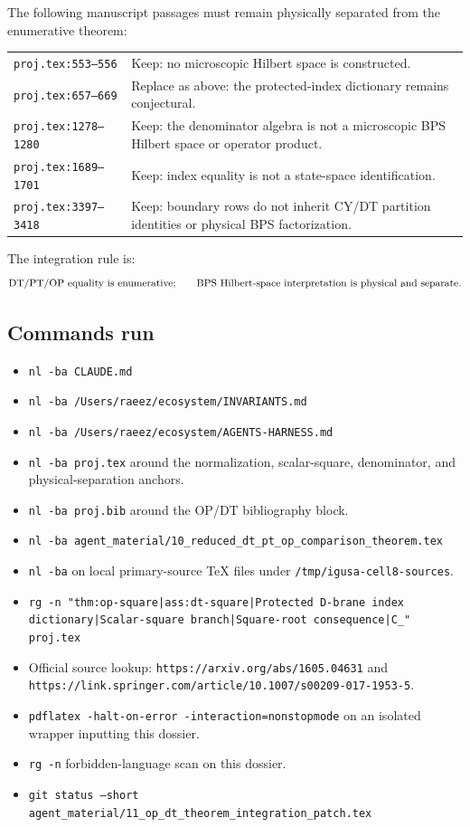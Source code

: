 The following manuscript passages must remain physically separated from
the enumerative theorem:
\begin{center}
\small
\begin{tabular}{p{}p{}}
\texttt{proj.tex:553--556} &
Keep: no microscopic Hilbert space is constructed.\\
\texttt{proj.tex:657--669} &
Replace as above: the protected-index dictionary remains conjectural.\\
\texttt{proj.tex:1278--1280} &
Keep: the denominator algebra is not a microscopic BPS Hilbert space or
operator product.\\
\texttt{proj.tex:1689--1701} &
Keep: index equality is not a state-space identification.\\
\texttt{proj.tex:3397--3418} &
Keep: boundary rows do not inherit CY/DT partition identities or physical
BPS factorization.
\end{tabular}
\end{center}
The integration rule is:
\[
\hbox{DT/PT/OP equality is enumerative;}
\qquad
\hbox{BPS Hilbert-space interpretation is physical and separate.}
\]

\subsection{Commands run}

\begin{itemize}
\item \texttt{nl -ba CLAUDE.md}
\item \texttt{nl -ba /Users/raeez/ecosystem/INVARIANTS.md}
\item \texttt{nl -ba /Users/raeez/ecosystem/AGENTS-HARNESS.md}
\item \texttt{nl -ba proj.tex} around the normalization, scalar-square,
denominator, and physical-separation anchors.
\item \texttt{nl -ba proj.bib} around the OP/DT bibliography block.
\item \texttt{nl -ba agent\_material/10\_reduced\_dt\_pt\_op\_comparison\_theorem.tex}
\item \texttt{nl -ba} on local primary-source TeX files under
\texttt{/tmp/igusa-cell8-sources}.
\item \texttt{rg -n "thm:op-square|ass:dt-square|Protected D-brane index dictionary|Scalar-square branch|Square-root consequence|C\_" proj.tex}
\item Official source lookup: \texttt{https://arxiv.org/abs/1605.04631}
and \texttt{https://link.springer.com/article/10.1007/s00209-017-1953-5}.
\item \texttt{pdflatex -halt-on-error -interaction=nonstopmode} on an
isolated wrapper inputting this dossier.
\item \texttt{rg -n} forbidden-language scan on this dossier.
\item \texttt{git status --short agent\_material/11\_op\_dt\_theorem\_integration\_patch.tex}
\end{itemize}

